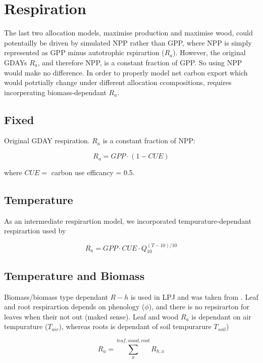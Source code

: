 \section{Respiration}
The last two allocation models, maximise production and maximise wood, could potentailly be driven by simulated NPP rather than GPP, where NPP is simply represented as GPP minus autotrophic rspirartion ($R_{a}$). However, the original GDAYs $R_{a}$, and therefore NPP, is a constant fraction of GPP. So using NPP would make no difference. In order to properly model net carbon export which would potrtially change under different allocation ccompositions, requires incorperating biomass-dependant $R_{a}$.

\subsection{Fixed}

Original GDAY respiration. $R_{a}$ is a constant fraction of NPP:

\begin{equation}
	R_{a} = GPP \cdot  (1 - CUE)
\end{equation}

where $CUE =$ carbon use efficancy = 0.5.

\subsection{Temperature}
As an intermediate respirartion model, we incorporated tempurature-dependant respirartion used by \citet{Medlyn2000}

\begin{equation}
	R_{a} = GPP \cdot CUE \cdot Q_{10}^{(T-10)/10}
\end{equation}

\subsection{Temperature and Biomass}
Biomass/biomass type dependant $R-{h}$ is used in LPJ and was taken from \citet{sitch2003}. Leaf and root respirartion depends on phenology ($\phi$), and there is no repsirarton for leaves when their not out (maked sense). Leaf and wood $R_{a}$ is dependant on air tempurature ($T_{air}$), whereas roots is dependant of soil tempurarure $T_{soil}$)


\begin{equation}
	R_{a} = \sum_{x}^{leaf,wood,root} R_{h,x}
\end{equation}

